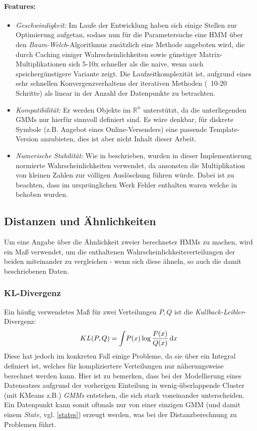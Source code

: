 \documentclass{DEarticle}
\begin{document}
\paragraph{Features:}
\begin{itemize}
\item \emph{Geschwindigkeit:} Im Laufe der Entwicklung haben sich einige Stellen zur Optimierung aufgetan, sodass nun
für die Parametersuche eine HMM über den \emph{Baum-Welch}-Algorithmus zusätzlich eine Methode angeboten wird, die durch
Caching einiger Wahrscheinlichkeiten sowie günstiger Matrix-Multiplikationen sich 5-10x schneller als die naive, wenn auch
speichergünstigere Variante zeigt.
Die Laufzeitkomplexität ist, aufgrund eines sehr schnellen Konvergenzverhaltens der iterativen Methoden (~10-20
Schritte) als linear in der Anzahl der Datenpunkte zu betrachten.
\item \emph{Kompatibilität:} Er werden Objekte im $\mathbb{R}^n$ unterstützt, da die unterliegenden GMMs nur hierfür
sinnvoll definiert sind. Es wäre denkbar, für diskrete Symbole (z.B. Angebot eines Online-Versenders) eine passende
Template-Version anzubieten, dies ist aber nicht Inhalt dieser Arbeit.
\item \emph{Numerische Stabilität:} Wie in \cite{rabin} beschrieben, wurden in dieser Implementierung normierte
Wahrscheinlichkeiten verwendet, da ansonsten die Multiplikation von kleinen Zahlen zur völligen Auslöschung führen
würde. Dabei ist zu beachten, dass im ursprünglichen Werk Fehler enthalten waren welche in \cite{erratumr} behoben wurden.
\end{itemize}


\subsection{Distanzen und Ähnlichkeiten}

Um eine Angabe über die Ähnlichkeit zweier berechneter HMMs zu machen, wird ein Maß verwendet, um die enthaltenen
Wahrscheinlichkeitsverteilungen der beiden miteinander zu vergleichen - wenn sich diese ähneln, so auch die damit
beschriebenen Daten.
\subsubsection{KL-Divergenz}
Ein häufig verwendetes Maß für zwei Verteilungen $P, Q$ ist die \emph{Kullback-Leibler}-Divergenz: 
$$KL(P,Q) = \int \! P(x) \log {P(x) \over Q(x)} \, \mathrm{d} x$$
Diese hat jedoch im konkreten Fall einige Probleme,
da sie über ein Integral definiert ist, welches für kompliziertere Verteilungen nur näherungsweise berechnet werden
kann.
Hier ist zu bemerken, dass bei der Modellierung eines Datensatzes aufgrund der vorherigen Einteilung in wenig-überlappende Cluster (mit KMeans z.B.) 
\emph{GMMs} entstehen, die sich stark voneinander unterscheiden. Ein Datenpunkt kann somit oftmals nur von einer
einzigen GMM (und damit einem \emph{State}, vgl. \ref{states}) erzeugt werden, was bei der Distanzberechnung zu
Problemen führt.
\end{document}
